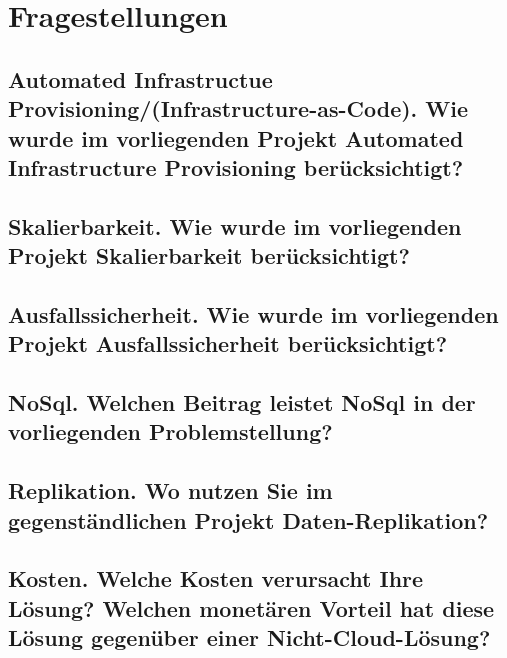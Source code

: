 \documentclass[11pt, a4paper, twoside]{article}   	%
\begin{document}
\section{Fragestellungen}
\subsection{Automated Infrastructue Provisioning/(Infrastructure-as-Code). Wie wurde im vorliegenden Projekt Automated Infrastructure Provisioning berücksichtigt?}


\subsection{Skalierbarkeit. Wie wurde im vorliegenden Projekt Skalierbarkeit berücksichtigt?}


\subsection{Ausfallssicherheit.  Wie wurde im vorliegenden Projekt Ausfallssicherheit berücksichtigt?}


\subsection{NoSql. Welchen Beitrag leistet NoSql in der vorliegenden Problemstellung?}


\subsection{Replikation. Wo nutzen Sie im gegenständlichen Projekt Daten-Replikation?}

\subsection{Kosten. Welche Kosten verursacht Ihre Lösung? Welchen monetären Vorteil hat diese Lösung gegenüber einer Nicht-Cloud-Lösung?}
\end{document}
